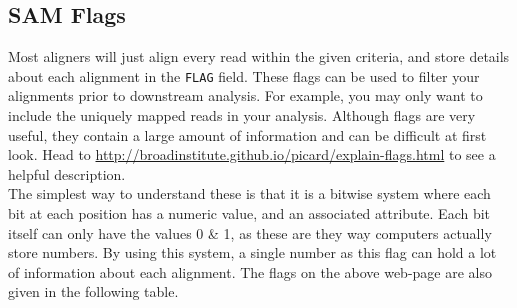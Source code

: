 \subsection{SAM Flags}
\begin{information}
Most aligners will just align every read within the given criteria, and store details about each alignment in the \texttt{FLAG} field.
These flags can be used to filter your alignments prior to downstream analysis.
For example, you may only want to include the uniquely mapped reads in your analysis.
Although flags are very useful, they contain a large amount of information and can be difficult at first look.
Head to \url{http://broadinstitute.github.io/picard/explain-flags.html} to see a helpful description.\\

The simplest way to understand these is that it is a bitwise system where each bit at each position has a numeric value, and an associated attribute.
Each bit itself can only have the values 0 \& 1, as these are they way computers actually store numbers.
By using this system, a single number as this flag can hold a lot of information about each alignment.
The flags on the above web-page are also given in the following table.\\


\end{information}

